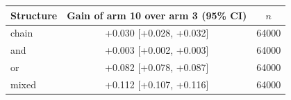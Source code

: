 \begin{tabular}{lcc}\toprule
Structure & Gain of arm 10 over arm 3 (95\% CI) & $n$ \\\midrule
chain & +0.030 [+0.028, +0.032] & 64000 \\
and & +0.003 [+0.002, +0.003] & 64000 \\
or & +0.082 [+0.078, +0.087] & 64000 \\
mixed & +0.112 [+0.107, +0.116] & 64000 \\
\bottomrule\end{tabular}
